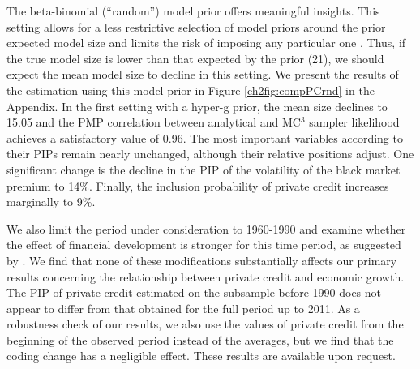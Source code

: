 \begin{refsection}
The beta-binomial (``random'') model prior offers meaningful insights. This setting allows for a less restrictive selection of model priors around the prior expected model size and limits the risk of imposing any particular one \parencite{LeySteel2009}. Thus, if the true model size is lower than that expected by the prior (21), we should expect the mean model size to decline in this setting. 
%
We present the results of the estimation using this model prior in Figure \ref{ch2fig:compPCrnd} in the Appendix. In the first setting with a hyper-g prior, the mean size declines to 15.05 and the PMP correlation between analytical and MC$^{3}$ sampler likelihood achieves a satisfactory value of 0.96. The most important variables according to their \acp{PIP} remain nearly unchanged, although their relative positions adjust. One significant change is the decline in the PIP of the volatility of the black market premium to 14\%. Finally, the inclusion probability of private credit increases marginally to 9\%. 

We also limit the period under consideration to 1960-1990 and examine whether the effect of financial development is stronger for this time period, as suggested by \textcite{RousseauWachtel2011}. We find that none of these modifications substantially affects our primary results concerning the relationship between private credit and economic growth.  The PIP of private credit estimated on the subsample before 1990 does not appear to differ from that obtained for the full period up to 2011. As a robustness check of our results, we also use the values of private credit from the beginning of the observed period instead of the averages, but we find that the coding change has a negligible effect. These results are available upon request.


\end{refsection}

